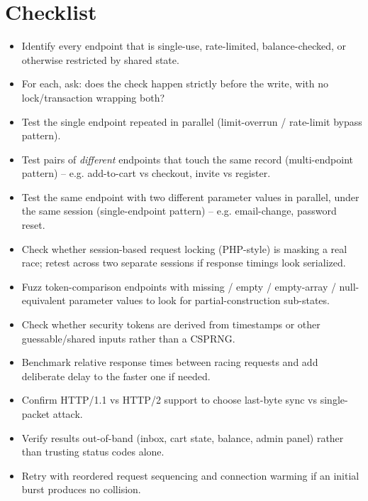 \documentclass[11pt]{article}
\begin{document}
\section{Checklist}
\begin{itemize}[leftmargin=1.2em]
  \item[$\square$] Identify every endpoint that is single-use, rate-limited, balance-checked, or otherwise restricted by shared state.
  \item[$\square$] For each, ask: does the check happen strictly before the write, with no lock/transaction wrapping both?
  \item[$\square$] Test the single endpoint repeated in parallel (limit-overrun / rate-limit bypass pattern).
  \item[$\square$] Test pairs of \emph{different} endpoints that touch the same record (multi-endpoint pattern) -- e.g. add-to-cart vs checkout, invite vs register.
  \item[$\square$] Test the same endpoint with two different parameter values in parallel, under the same session (single-endpoint pattern) -- e.g. email-change, password reset.
  \item[$\square$] Check whether session-based request locking (PHP-style) is masking a real race; retest across two separate sessions if response timings look serialized.
  \item[$\square$] Fuzz token-comparison endpoints with missing / empty / empty-array / null-equivalent parameter values to look for partial-construction sub-states.
  \item[$\square$] Check whether security tokens are derived from timestamps or other guessable/shared inputs rather than a CSPRNG.
  \item[$\square$] Benchmark relative response times between racing requests and add deliberate delay to the faster one if needed.
  \item[$\square$] Confirm HTTP/1.1 vs HTTP/2 support to choose last-byte sync vs single-packet attack.
  \item[$\square$] Verify results out-of-band (inbox, cart state, balance, admin panel) rather than trusting status codes alone.
  \item[$\square$] Retry with reordered request sequencing and connection warming if an initial burst produces no collision.
\end{itemize}
 
\end{document}

